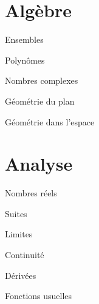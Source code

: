 \documentclass[12pt]{article}
\begin{document}
\part{Algèbre}

%


\begin{quiz}{Ensembles}

\end{quiz}

\begin{quiz}{Polynômes}

\end{quiz}

\begin{quiz}{Nombres complexes}

\end{quiz}

\begin{quiz}{Géométrie du plan}

\end{quiz}

\begin{quiz}{Géométrie dans l'espace}

\end{quiz}


\part{Analyse}
\begin{quiz}{Nombres réels}

\end{quiz}

\begin{quiz}{Suites}

\end{quiz}

\begin{quiz}{Limites}

\end{quiz}

\begin{quiz}{Continuité}

\end{quiz}

\begin{quiz}{Dérivées}

\end{quiz}

\begin{quiz}{Fonctions usuelles}

\end{quiz}
\end{document}
